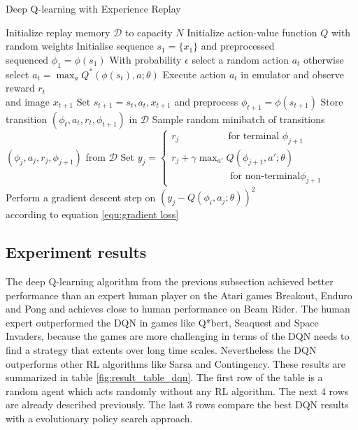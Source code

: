 \documentclass[conference]{IEEEtran}
\begin{document}
\begin{algorithm}
\caption{Deep Q-learning with Experience Replay \cite{mnih-atari-2013}} \label{alg:deep q learning}
\begin{algorithmic}
\STATE Initialize replay memory $\mathcal{D}$ to capacity $N$
\STATE Initialize action-value function $Q$ with random weights
	\STATE Initialise sequence $s_1 = \{x_1\}$ and preprocessed \\
	\qquad sequenced $\phi_1 = \phi(s_1)$
		\STATE With probability $\epsilon$ select a random action $a_t$
		\STATE otherwise select $a_t = \max_a Q^* (\phi(s_t),a;\theta)$
		\STATE Execute action $a_t$ in emulator and observe reward $r_t$ \\
		\qquad and image $x_{t+1}$
		\STATE Set $s_{t+1} = s_t, a_t, x_{t+1}$ and preprocess $\phi_{t+1} =
		\phi(s_{t+1})$
		\STATE Store transition $(\phi_t,a_t,r_t,\phi_{t+1})$ in $\mathcal{D}$
		\STATE Sample random minibatch of transitions \\
		\qquad $(\phi_j,a_j,r_j,\phi_{j+1})$ from $\mathcal{D}$
		\STATE \medskip Set $y_j = \begin{cases} 
			r_j \qquad \qquad \quad \text{for terminal } \phi_{j+1} \\
			r_j + \gamma \max_{a'} Q(\phi_{j+1},a';\theta) \\
			\qquad \qquad \qquad \text{for non-terminal} \phi_{j+1}		
		\end{cases}$
		\STATE Perform a gradient descent step on $(y_j - 
		Q(\phi_i,a_j;\theta))^2$ \\ \qquad according to equation
		\ref{equ:gradient loss}
	\ENDFOR
\ENDFOR
\end{algorithmic}
\end{algorithm} 

\subsection{Experiment results}

The deep Q-learning algorithm from the previous subsection achieved better performance than an expert human player on the Atari games Breakout, Enduro and Pong and achieves close to human performance on Beam Rider. The human expert outperformed the DQN in games like Q*bert, Seaquest and Space Invaders, because the games are more challenging in terms of the DQN needs to find a strategy that extents over long time scales. Nevertheless the DQN outperforms other RL algorithms like Sarsa and Contingency. These results are summarized in table \ref{fig:result_table_dqn}. The first row of the table is a random agent which acts randomly without any RL algorithm. The next 4 rows are already described previously. The last 3 rows compare the best DQN results with a evolutionary policy search approach. 
\end{document}
